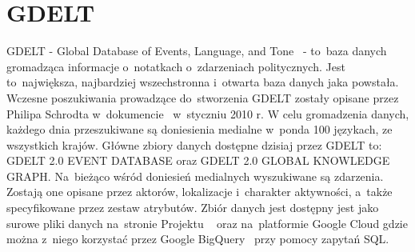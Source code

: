 \documentclass[11pt]{report}
\begin{document}
    \section{GDELT}\label{sec:gdelt}
    GDELT - Global Database of Events, Language, and Tone~\cite{gdelt} - to~baza danych gromadząca informacje o~notatkach o~zdarzeniach politycznych.
    Jest to~największa, najbardziej wszechstronna i~otwarta baza danych jaka powstała.
    Wczesne poszukiwania prowadzące do~stworzenia GDELT zostały opisane przez Philipa Schrodta w~dokumencie~\cite{Schrodt2010} w~styczniu 2010 r.
    W celu gromadzenia danych, każdego dnia przeszukiwane są doniesienia medialne w~ponda 100 językach, ze wszystkich krajów.
    Główne zbiory danych dostępne dzisiaj przez GDELT to:
    GDELT 2.0 EVENT DATABASE oraz
    GDELT 2.0 GLOBAL KNOWLEDGE GRAPH\@.
    Na~bieżąco wśród doniesień medialnych wyszukiwane są zdarzenia.
    Zostają one opisane przez aktorów, lokalizacje i~charakter aktywności, a~także specyfikowane przez zestaw atrybutów.
    Zbiór danych jest dostępny jest jako surowe pliki danych na~stronie Projektu ~\cite{gdelt}
    oraz na~platformie Google Cloud gdzie można z~niego korzystać przez Google BigQuery~\cite{BigQuery2014} przy pomocy zapytań SQL\@.
\end{document}
